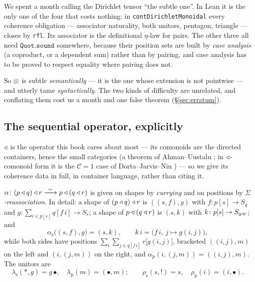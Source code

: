 \begin{Remark}
\label{rem:tame}
We spent a month calling the Dirichlet tensor ``the subtle one''. In Lean it is
the only one of the four that costs nothing: in
\texttt{contDirichletMonoidal} every coherence obligation ---
associator naturality, both unitors, pentagon, triangle --- closes by
\texttt{rfl}. Its associator is the definitional $\eta$-law for pairs. The other
three all need $\texttt{Quot.sound}$ somewhere, because their position sets are
built by \emph{case analysis} (a coproduct, or a dependent sum) rather than by
pairing, and case analysis has to be proved to respect equality where pairing
does not.

So $\mathbin{\otimes}$ is subtle \emph{semantically} --- it is the one whose extension is not
pointwise --- and utterly tame \emph{syntactically}. The two kinds of difficulty
are unrelated, and conflating them cost us a month and one false theorem
(§\ref{sec:erratum}).
\end{Remark}

\subsection{The sequential operator, explicitly}
\label{sec:seq}

$\mathbin{\triangleleft}$ is the operator this book cares about most --- its comonoids are the
directed containers, hence the small categories (a theorem of Ahman--Uustalu
\cite{AhmanUustalu}; in $\mathbin{\triangleleft}$-comonoid form it is the $\mathcal C=1$ case of
Dorta--Jarvis--Niu \cite[Thm.~4.3]{DJN23}) --- so we give its coherence
data in full, in container language, rather than citing it.

\begin{Proposition}\label{prop:seqassoc}
$\alpha\colon (p\mathbin{\triangleleft} q)\mathbin{\triangleleft} r\xrightarrow{\ \sim\ } p\mathbin{\triangleleft}(q\mathbin{\triangleleft} r)$ is given on
shapes by \emph{currying} and on positions by \emph{$\Sigma$-reassociation}. In
detail: a shape of $(p\mathbin{\triangleleft} q)\mathbin{\triangleleft} r$ is $((s,f),g)$ with $f\colon p[s]\to S_q$
and $g\colon\sum_{i\in p[s]}q[f\,i]\to S_r$; a shape of $p\mathbin{\triangleleft}(q\mathbin{\triangleleft} r)$ is
$(s,k)$ with $k\colon p[s]\to S_{q\mathbin{\triangleleft} r}$; and
\[
  \alpha_{\mathrm s}\bigl((s,f),g\bigr)=(s,k),\qquad
  k\,i=\bigl(f\,i,\ j\mapsto g(i,j)\bigr),
\]
while both sides have positions $\sum_i\sum_{j\in q[f\,i]} r\bigl[g(i,j)\bigr]$,
bracketed $((i,j),m)$ on the left and $(i,(j,m))$ on the right, and
$\alpha_{\mathrm p}(i,(j,m))=((i,j),m)$. The unitors are
\[
  \lambda_{\mathrm s}(\ast,g)=g\,\bullet,\quad \lambda_{\mathrm p}(m)=(\bullet,m);
  \qquad
  \rho_{\mathrm s}(s,!)=s,\quad \rho_{\mathrm p}(i)=(i,\bullet).
\]
\end{Proposition}

